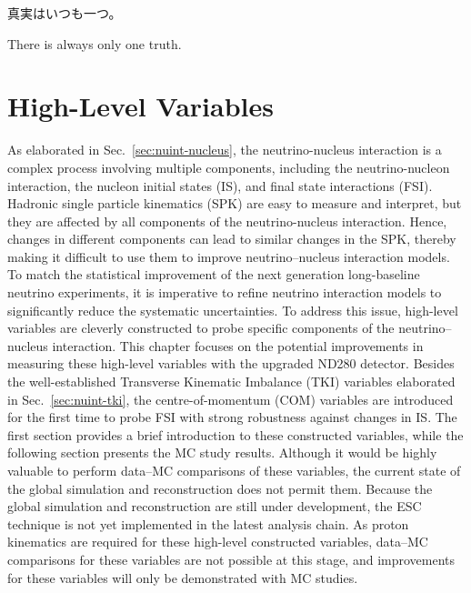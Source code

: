 \begin{savequote}[8cm]
\begin{CJK*}{UTF8}{min}
真実はいつも一つ。
\end{CJK*}

There is always only one truth.
\end{savequote}

\chapter{\label{ch:datamc}High-Level Variables} 
\minitoc

As elaborated in Sec.~\ref{sec:nuint-nucleus}, the neutrino-nucleus interaction is a complex process involving multiple components, including the neutrino-nucleon interaction, the nucleon initial states (IS), and final state interactions (FSI).
Hadronic single particle kinematics (SPK) are easy to measure and interpret, but they are affected by all components of the neutrino-nucleus interaction. 
Hence, changes in different components can lead to similar changes in the SPK, thereby making it difficult to use them to improve neutrino–nucleus interaction models.
To match the statistical improvement of the next generation long-baseline neutrino experiments, it is imperative to refine neutrino interaction models to significantly reduce the systematic uncertainties.
To address this issue, high-level variables are cleverly constructed to probe specific components of the neutrino–nucleus interaction.
This chapter focuses on the potential improvements in measuring these high-level variables with the upgraded ND280 detector.
Besides the well-established Transverse Kinematic Imbalance (TKI) variables elaborated in Sec.~\ref{sec:nuint-tki}, the centre-of-momentum (COM) variables are introduced for the first time to probe FSI with strong robustness against changes in IS.
The first section provides a brief introduction to these constructed variables, while the following section presents the MC study results.
Although it would be highly valuable to perform data–MC comparisons of these variables, the current state of the global simulation and reconstruction does not permit them.
Because the global simulation and reconstruction are still under development, the ESC technique is not yet implemented in the latest analysis chain.
As proton kinematics are required for these high-level constructed variables, data–MC comparisons for these variables are not possible at this stage, and improvements for these variables will only be demonstrated with MC studies.

